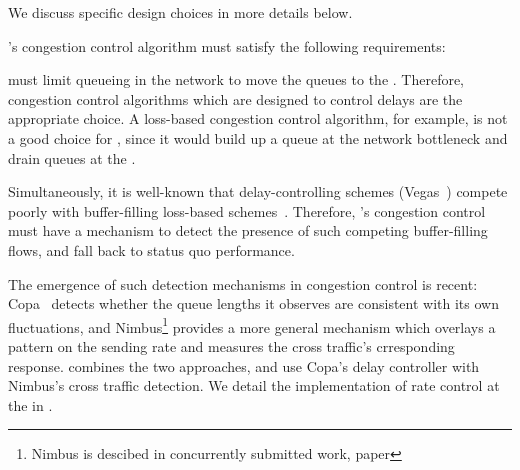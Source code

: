 \vspace{5pt}
\noindent We discuss specific design choices in more details below. 

\name's congestion control algorithm must satisfy the following requirements: 

 \name must limit queueing in the network to move the queues to the \inbox. Therefore, congestion control algorithms which are designed to control delays are the appropriate choice. 
A loss-based congestion control algorithm, for example, is not a good choice for \name, since it would build up a queue at the network bottleneck and drain queues at the \inbox.

 Simultaneously, it is well-known that delay-controlling schemes (\eg Vegas~\cite{vegas}) compete poorly with buffer-filling loss-based schemes~\cite{nimbus, copa, timely}. Therefore, \name's congestion control must have a mechanism to detect the presence of such competing buffer-filling flows, and fall back to status quo performance. 

The emergence of such detection mechanisms in congestion control is recent: Copa~\cite{copa} detects whether the queue lengths it observes are consistent with its own fluctuations, and Nimbus\footnote{Nimbus is descibed in concurrently submitted work, paper } provides a more general mechanism which overlays a pattern on the sending rate and measures the cross traffic's crresponding response.
\name combines the two approaches, and use Copa's delay controller with Nimbus's cross traffic detection.
We detail the implementation of rate control at the \inbox in .

